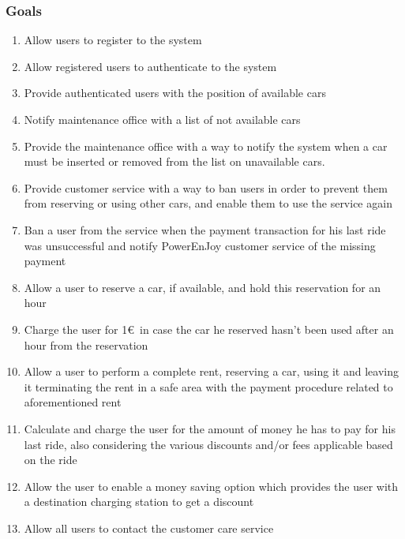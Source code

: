 	\subsubsection{Goals}
	\begin{enumerate}[label=\textbf{G\arabic*}]
		\item \label{goal:register} Allow users to register to the system
		\item \label{goal:login}Allow registered users to authenticate to the system
		\item \label{goal:position}Provide authenticated users with the position of available cars
		\item \label{goal:notifyMaintenance}Notify maintenance office with a list of not available cars 
		\item \label{goal:maintenance}Provide the maintenance office with a way to notify the system when a car must be inserted or removed from the list on unavailable cars.
		\item \label{goal:banUnbanUsers}Provide customer service with a way to ban users in order to prevent them from reserving or using other cars, and enable them to use the service again
		\item \label{goal:banPaymentFailed}Ban a user from the service when the payment transaction for his last ride was unsuccessful and notify PowerEnJoy customer service of the missing payment
		\item \label{goal:carReservation} Allow a user to reserve a car, if available, and hold this reservation for an hour
		\item \label{goal:reservationFee}Charge the user for 1\euro\ in case the car he reserved hasn't been used after an hour from the reservation
		\item \label{goal:completeRent}Allow a user to perform a complete rent, reserving a car, using it and leaving it terminating the rent in a safe area with the payment procedure related to aforementioned rent 
		\item \label{goal:calculateCost}Calculate and charge the user for the amount of money he has to pay for his last ride, also considering the various discounts and/or fees applicable based on the ride
		\item \label{goal:moneySavingOption}Allow the user to enable a money saving option which provides the user with a destination charging station to get a discount
		\item \label{goal:contactCustomerCare}Allow all users to contact the customer care service
	\end{enumerate}

